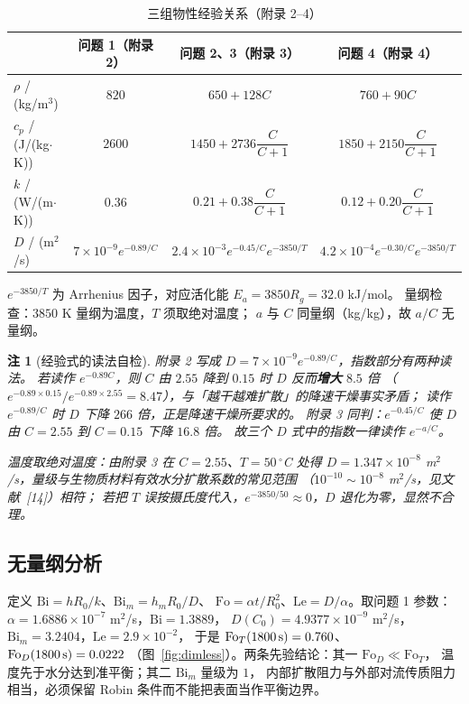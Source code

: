 \documentclass[bwprint]{cumcmthesis}
\newtheorem{remark}{注}
\begin{document}
\begin{table}[H]
\centering
\small
\caption{三组物性经验关系（附录 2--4）}
\begin{tabular}{@{}lccc@{}}
\toprule
 & 问题 1（附录 2） & 问题 2、3（附录 3） & 问题 4（附录 4） \\
\midrule
$\rho$ / (kg/m$^3$) & $820$ & $650+128C$ & $760+90C$ \\
$c_p$ / (J/(kg$\cdot$K)) & $2600$ & $1450+2736\dfrac{C}{C+1}$ & $1850+2150\dfrac{C}{C+1}$ \\
$k$ / (W/(m$\cdot$K)) & $0.36$ & $0.21+0.38\dfrac{C}{C+1}$ & $0.12+0.20\dfrac{C}{C+1}$ \\
$D$ / (m$^2$/s) & $7\times10^{-9}e^{-0.89/C}$ &
$2.4\times10^{-3}e^{-0.45/C}e^{-3850/T}$ &
$4.2\times10^{-4}e^{-0.30/C}e^{-3850/T}$ \\
\bottomrule
\end{tabular}
\end{table}

$e^{-3850/T}$ 为 Arrhenius 因子，对应活化能 $E_a=3850R_g=32.0$ kJ/mol。
量纲检查：$3850$ K 量纲为温度，$T$ 须取绝对温度；
$a$ 与 $C$ 同量纲（kg/kg），故 $a/C$ 无量纲。

\begin{remark}[经验式的读法自检]
附录 2 写成 $D=7\times10^{-9}e^{-0.89/C}$，指数部分有两种读法。
若读作 $e^{-0.89C}$，则 $C$ 由 $2.55$ 降到 $0.15$ 时 $D$ 反而\textbf{增大} $8.5$ 倍
（$e^{-0.89\times0.15}/e^{-0.89\times2.55}=8.47$），与「越干越难扩散」的降速干燥事实矛盾；
读作 $e^{-0.89/C}$ 时 $D$ 下降 $266$ 倍，正是降速干燥所要求的。
附录 3 同判：$e^{-0.45/C}$ 使 $D$ 由 $C=2.55$ 到 $C=0.15$ 下降 $16.8$ 倍。
故三个 $D$ 式中的指数一律读作 $e^{-a/C}$。

温度取绝对温度：由附录 3 在 $C=2.55$、$T=50\,^\circ$C 处得
$D=1.347\times10^{-8}$ m$^2$/s，量级与生物质材料有效水分扩散系数的常见范围
（$10^{-10}\sim10^{-8}$ m$^2$/s，见文献~[14]）相符；
若把 $T$ 误按摄氏度代入，$e^{-3850/50}\approx0$，$D$ 退化为零，显然不合理。
\end{remark}

\subsection{无量纲分析}

定义 $\mathrm{Bi}=hR_0/k$、$\mathrm{Bi}_m=h_mR_0/D$、
$\mathrm{Fo}=\alpha t/R_0^2$、$\mathrm{Le}=D/\alpha$。取问题 1 参数：
$\alpha=1.6886\times10^{-7}$ m$^2$/s，$\mathrm{Bi}=1.3889$，
$D(C_0)=4.9377\times10^{-9}$ m$^2$/s，$\mathrm{Bi}_m=3.2404$，$\mathrm{Le}=2.9\times10^{-2}$，
于是 $\mathrm{Fo}_T(1800\,{\rm s})=0.760$、$\mathrm{Fo}_D(1800\,{\rm s})=0.0222$
（图~\ref{fig:dimless}）。两条先验结论：其一 $\mathrm{Fo}_D\ll\mathrm{Fo}_T$，
温度先于水分达到准平衡；其二 $\mathrm{Bi}_m$ 量级为 $1$，
内部扩散阻力与外部对流传质阻力相当，必须保留 Robin 条件而不能把表面当作平衡边界。
\end{document}

